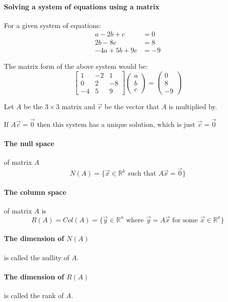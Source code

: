 \documentclass{article}
\begin{document}
\paragraph{Solving a system of equations using a matrix}
For a given system of equations:
\begin{align*}
    a - 2b + c &= 0 \\
    2b - 8c &= 8 \\
    -4a + 5b + 9c &= -9
\end{align*}

The matrix form of the above system would be:
$$
\begin{bmatrix}
    1 & -2 & 1 \\
    0 & 2 & -8 \\
    -4 & 5 & 9
\end{bmatrix}
\begin{pmatrix}
    a \\
    b \\
    c
\end{pmatrix}
=
\begin{pmatrix}
    0 \\
    8 \\
    -9
\end{pmatrix}
$$

Let $A$ be the $3 \times 3$ matrix and $\vec{c}$ be the vector that $A$ is multiplied by.

If $A\vec{c} = \vec{0}$ then this system has a unique solution, which is just $\vec{c} = \vec{0}$

\paragraph{The null space} of matrix $A$
$$
N(A) = \{ \vec{x} \in \mathbb{R}^k \text{ such that } A\vec{x} = \vec{0} \}
$$

\paragraph{The column space} of matrix $A$ is
$$
R(A) = Col(A) = \{ \vec{y} \in \mathbb{R}^n \text{ where } \vec{y} = A\vec{x} \text{ for some } \vec{x} \in \mathbb{R}^x \}
$$

\paragraph{The dimension of $N(A)$} is called the nullity of $A$.
\paragraph{The dimension of $R(A)$} is called the rank of $A$.
\end{document}
